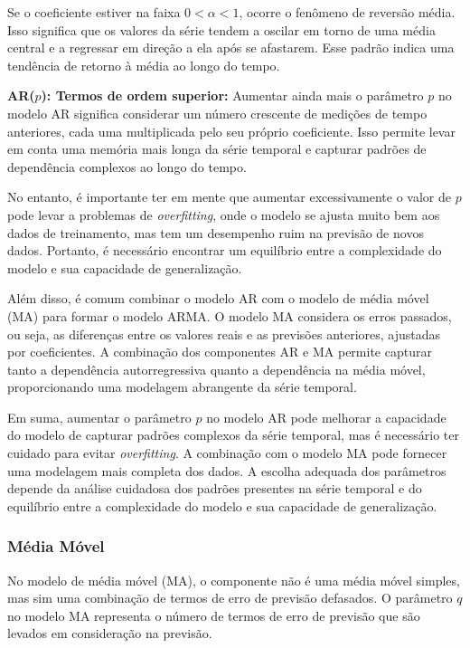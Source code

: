 Se o coeficiente estiver na faixa $0 < \alpha < 1$, ocorre o fenômeno de reversão média. Isso significa que os valores da série tendem a oscilar em torno de uma média central e a regressar em direção a ela após se afastarem. Esse padrão indica uma tendência de retorno à média ao longo do tempo.


\textbf{AR($p$): Termos de ordem superior: }
Aumentar ainda mais o parâmetro $p$ no modelo AR significa considerar um número crescente de medições de tempo anteriores, cada uma multiplicada pelo seu próprio coeficiente. Isso permite levar em conta uma memória mais longa da série temporal e capturar padrões de dependência complexos ao longo do tempo.

No entanto, é importante ter em mente que aumentar excessivamente o valor de $p$ pode levar a problemas de \textit{overfitting}, onde o modelo se ajusta muito bem aos dados de treinamento, mas tem um desempenho ruim na previsão de novos dados. Portanto, é necessário encontrar um equilíbrio entre a complexidade do modelo e sua capacidade de generalização.

Além disso, é comum combinar o modelo AR com o modelo de média móvel (MA) para formar o modelo ARMA. O modelo MA considera os erros passados, ou seja, as diferenças entre os valores reais e as previsões anteriores, ajustadas por coeficientes. A combinação dos componentes AR e MA permite capturar tanto a dependência autorregressiva quanto a dependência na média móvel, proporcionando uma modelagem abrangente da série temporal.

Em suma, aumentar o parâmetro $p$ no modelo AR pode melhorar a capacidade do modelo de capturar padrões complexos da série temporal, mas é necessário ter cuidado para evitar \textit{overfitting}. A combinação com o modelo MA pode fornecer uma modelagem mais completa dos dados. A escolha adequada dos parâmetros depende da análise cuidadosa dos padrões presentes na série temporal e do equilíbrio entre a complexidade do modelo e sua capacidade de generalização.

\subsubsection{M\'edia M\'ovel}\label{subsubsec:ma}
No modelo de média móvel (MA), o componente não é uma média móvel simples, mas sim uma combinação de termos de erro de previsão defasados. O parâmetro $q$ no modelo MA representa o número de termos de erro de previsão que são levados em consideração na previsão.

